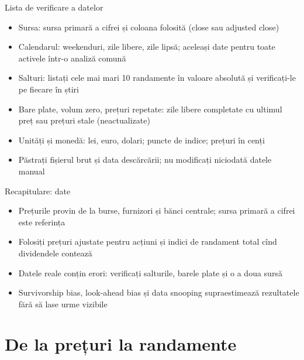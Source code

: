\begin{frame}{Lista de verificare a datelor}
\itemsize{\small}
\begin{itemize}
    \item Sursa: sursa primară a cifrei și coloana folosită (close sau adjusted close)
    \item Calendarul: weekenduri, zile libere, zile lipsă; aceleași date pentru toate activele într-o analiză comună
    \item Salturi: listați cele mai mari 10 randamente în valoare absolută și verificați-le pe fiecare în știri
    \item Bare plate, volum zero, prețuri repetate: zile libere completate cu ultimul preț sau prețuri stale (neactualizate)
    \item Unități și monedă: lei, euro, dolari; puncte de indice; prețuri în cenți
    \item Păstrați fișierul brut și data descărcării; nu modificați niciodată datele manual
\end{itemize}
\end{frame}

\begin{frame}{Recapitulare: date}
\itemsize{\small}
\begin{itemize}
    \item Prețurile provin de la burse, furnizori și bănci centrale; sursa primară a cifrei este referința
    \item Folosiți prețuri ajustate pentru acțiuni și indici de randament total cînd dividendele contează
    \item Datele reale conțin erori: verificați salturile, barele plate și o a doua sursă
    \item Survivorship bias, look-ahead bias și data snooping supraestimează rezultatele fără să lase urme vizibile
\end{itemize}
\end{frame}


\section{De la prețuri la randamente}

